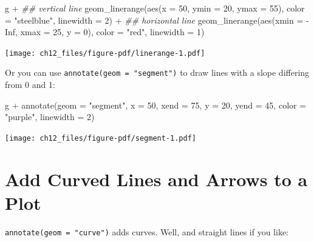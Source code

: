 \documentclass[
  letterpaper,
  DIV=11,
  numbers=noendperiod]{scrreprt}
\newenvironment{Shaded}{\begin{snugshade}}{\end{snugshade}}
\newcommand{\AttributeTok}[1]{\textcolor[rgb]{0.40,0.45,0.13}{#1}}
\newcommand{\ConstantTok}[1]{\textcolor[rgb]{0.56,0.35,0.01}{#1}}
\newcommand{\DecValTok}[1]{\textcolor[rgb]{0.68,0.00,0.00}{#1}}
\newcommand{\DocumentationTok}[1]{\textcolor[rgb]{0.37,0.37,0.37}{\textit{#1}}}
\newcommand{\FunctionTok}[1]{\textcolor[rgb]{0.28,0.35,0.67}{#1}}
\newcommand{\NormalTok}[1]{\textcolor[rgb]{0.00,0.23,0.31}{#1}}
\newcommand{\SpecialCharTok}[1]{\textcolor[rgb]{0.37,0.37,0.37}{#1}}
\newcommand{\StringTok}[1]{\textcolor[rgb]{0.13,0.47,0.30}{#1}}
\begin{document}
\begin{Shaded}
\begin{Highlighting}[]
\NormalTok{g }\SpecialCharTok{+}
  \DocumentationTok{\#\# vertical line}
  \FunctionTok{geom\_linerange}\NormalTok{(}\FunctionTok{aes}\NormalTok{(}\AttributeTok{x =} \DecValTok{50}\NormalTok{, }\AttributeTok{ymin =} \DecValTok{20}\NormalTok{, }\AttributeTok{ymax =} \DecValTok{55}\NormalTok{),}
                 \AttributeTok{color =} \StringTok{"steelblue"}\NormalTok{, }\AttributeTok{linewidth =} \DecValTok{2}\NormalTok{) }\SpecialCharTok{+}
  \DocumentationTok{\#\# horizontal line}
  \FunctionTok{geom\_linerange}\NormalTok{(}\FunctionTok{aes}\NormalTok{(}\AttributeTok{xmin =} \SpecialCharTok{{-}}\ConstantTok{Inf}\NormalTok{, }\AttributeTok{xmax =} \DecValTok{25}\NormalTok{, }\AttributeTok{y =} \DecValTok{0}\NormalTok{),}
                 \AttributeTok{color =} \StringTok{"red"}\NormalTok{, }\AttributeTok{linewidth =} \DecValTok{1}\NormalTok{)}
\end{Highlighting}
\end{Shaded}

\texttt{[image: ch12\_files/figure-pdf/linerange-1.pdf]}

Or you can use \texttt{annotate(geom\ =\ "segment")} to draw lines with
a slope differing from 0 and 1:

\begin{Shaded}
\begin{Highlighting}[]
\NormalTok{g }\SpecialCharTok{+}
  \FunctionTok{annotate}\NormalTok{(}\AttributeTok{geom =} \StringTok{"segment"}\NormalTok{, }
           \AttributeTok{x =} \DecValTok{50}\NormalTok{, }\AttributeTok{xend =} \DecValTok{75}\NormalTok{,}
                   \AttributeTok{y =} \DecValTok{20}\NormalTok{, }\AttributeTok{yend =} \DecValTok{45}\NormalTok{,}
               \AttributeTok{color =} \StringTok{"purple"}\NormalTok{, }\AttributeTok{linewidth =} \DecValTok{2}\NormalTok{)}
\end{Highlighting}
\end{Shaded}

\texttt{[image: ch12\_files/figure-pdf/segment-1.pdf]}

\section{Add Curved Lines and Arrows to a
Plot}\label{add-curved-lines-and-arrows-to-a-plot}

\texttt{annotate(geom\ =\ "curve")} adds curves. Well, and straight
lines if you like:
\end{document}
